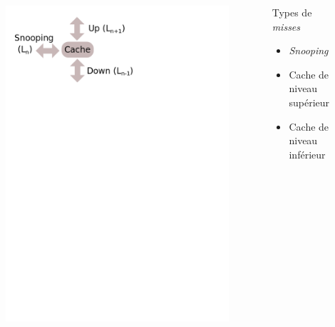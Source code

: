 \begin{frame}[fragile]
  \begin{columns}[T]
    \begin{column}{.5\textwidth}
      \begin{figure}[h!]
	\includegraphics[scale=.4]{images/misses.png}
      \end{figure}
    \end{column}
    \begin{column}{.5\textwidth}
      \bigskip
      \begin{block}{Types de \emph{misses}}
	\begin{itemize}
	\item{\emph{Snooping}}
        \item{Cache de niveau supérieur}
        \item{Cache de niveau inférieur}
	\end{itemize}
      \end{block}
    \end{column}
  \end{columns}
\end{frame}
